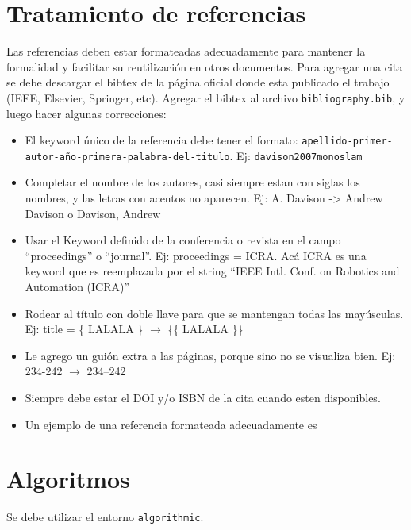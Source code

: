 \documentclass[a4paper,	11pt]{article}
\begin{document}
\section{Tratamiento de referencias}
Las referencias deben estar formateadas adecuadamente para mantener la formalidad y facilitar su reutilización en otros documentos. Para agregar una cita se debe descargar el bibtex de la página oficial donde esta publicado el trabajo (IEEE, Elsevier, Springer, etc). Agregar el bibtex al archivo \lstinline{bibliography.bib}, y luego hacer algunas correcciones:
\begin{itemize}
    \item El keyword único de la referencia debe tener el formato: \lstinline{apellido-primer-autor-año-primera-palabra-del-titulo}. Ej: \lstinline{davison2007monoslam}
    \item Completar el nombre de los autores, casi siempre estan con siglas los nombres, y las letras con acentos no aparecen. Ej: A. Davison -> Andrew Davison o Davison, Andrew
    \item Usar el Keyword definido de la conferencia o revista en el campo ``proceedings'' o ``journal''. Ej: proceedings = ICRA. Acá ICRA es una keyword que es reemplazada por el string ``IEEE Intl. Conf. on Robotics and Automation (ICRA)''
    \item Rodear al título con doble llave para que se mantengan todas las mayúsculas. Ej: title = \{ LALALA \} $\rightarrow$ \{\{ LALALA \}\}
    \item Le agrego un guión extra a las páginas, porque sino no se visualiza bien. Ej: 234-242 $\rightarrow$ 234--242
    \item Siempre debe estar el DOI y/o ISBN de la cita cuando esten disponibles.
    \item Un ejemplo de una referencia formateada adecuadamente es \cite{grisetti2010tutorial}
\end{itemize}


\section{Algoritmos}

Se debe utilizar el entorno \lstinline{algorithmic}.
\end{document}
